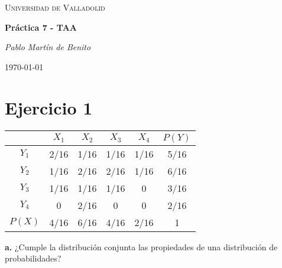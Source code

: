 \documentclass{article}
\begin{document}
\begin{titlepage}
    \centering
    
    \vspace{1cm}
    {\scshape\LARGE Universidad de Valladolid \par}
    \vspace{1.5cm}
    {\huge\bfseries Práctica 7 - TAA\par}
    \vspace{0.5cm}
    {\Large\itshape Pablo Martín de Benito\par}
    \vspace{1.5cm}
	\tableofcontents
    \vfill
    \vfill
    {\large \today\par}
\end{titlepage}


\newpage %

\section{Ejercicio 1 }

\begin{table}[h]
	\begin{adjustbox}{center}
		\begin{tabular}{|c|c|c|c|c|c|}
			\hline
			  & \textbf{$X_1$} & \textbf{$X_2$} & \textbf{$X_3$} & \textbf{$X_4$} & \textbf{$P(Y)$}  \\ \hline
			
			\textbf{$Y_1$} & 2/16 & 1/16 & 1/16 & 1/16 & 5/16 \\ \hline
			
			\textbf{$Y_2$} & 1/16 & 2/16 & 2/16 & 1/16 & 6/16 \\ \hline
			
			\textbf{$Y_3$} & 1/16 & 1/16 & 1/16 & 0 & 3/16 \\ \hline
			
			\textbf{$Y_4$} & 0 & 2/16 & 0 & 0 & 2/16 \\ \hline
			
			\textbf{$P(X)$} & 4/16 & 6/16 & 4/16 & 2/16 & 1 \\ \hline
		\end{tabular}
	\end{adjustbox}
\end{table}


\hspace{0.5cm} \textbf{a.} \hspace{0.5cm} ¿Cumple la distribución conjunta las propiedades de una distribución de probabilidades? \\ 
\end{document}
